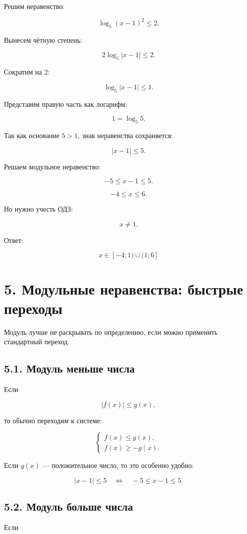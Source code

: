 \documentclass[a4paper,12pt]{article}
\begin{document}
Решим неравенство:

\[
\log_5(x-1)^2\le2.
\]

Вынесем чётную степень:

\[
2\log_5|x-1|\le2.
\]

Сократим на \(2\):

\[
\log_5|x-1|\le1.
\]

Представим правую часть как логарифм:

\[
1=\log_5 5.
\]

Так как основание \(5>1\), знак неравенства сохраняется:

\[
|x-1|\le5.
\]

Решаем модульное неравенство:

\[
-5\le x-1\le5.
\]

\[
-4\le x\le6.
\]

Но нужно учесть ОДЗ:

\[
x\ne1.
\]

Ответ:

\[
\boxed{x\in[-4;1)\cup(1;6]}
\]

\section*{5. Модульные неравенства: быстрые переходы}

Модуль лучше не раскрывать по определению, если можно применить стандартный переход.

\subsection*{5.1. Модуль меньше числа}

Если

\[
|f(x)|\le g(x),
\]

то обычно переходим к системе:

\[
\begin{cases}
f(x)\le g(x),\\
f(x)\ge -g(x).
\end{cases}
\]

Если \(g(x)\) — положительное число, то это особенно удобно:

\[
|x-1|\le5
\quad\Longleftrightarrow\quad
-5\le x-1\le5.
\]

\subsection*{5.2. Модуль больше числа}

Если
\end{document}
